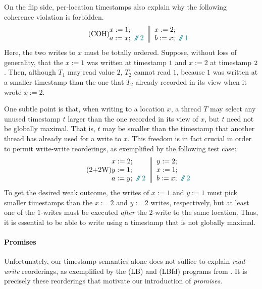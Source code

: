 On the flip side, per-location timestamps also explain why the following coherence
violation is forbidden.
\begin{equation}\label{eq:COH}\tag{COH}
\inarrII{x:=1;\\a:=x;\comment{2}}{x:=2;\\b:=x;\comment{1}}
\end{equation}
Here, the two writes to $x$ must be totally ordered.  Suppose, without
loss of generality, that the $x:=1$ was written at timestamp $\mbox{\small1}$ and
$x:=2$ at timestamp $\mbox{\small2}$.  Then, although $T_1$ may read value $2$,
$T_2$ cannot read $1$, because $1$ was written at a smaller timestamp
than the one that $T_2$ already recorded in its view when it wrote $x:=2$.


One subtle point is that, when writing to a location $x$, a
thread $T$ may select any unused timestamp $t$ larger than the one
recorded in its view of $x$, but $t$ need not be globally maximal.
That is, $t$ may be smaller than the timestamp that another thread has
already used for a write to $x$.  %
This freedom is in fact crucial in order to permit write-write reorderings, as
exemplified by the following test case:
\begin{equation}\label{eq:2+2W}\tag{2+2W}
\inarrII{x:=2;\\y:=1;\\a:=y;\comment{2}}{y:=2;\\x:=1;\\b:=x;\comment{2}}
\end{equation}
To get the desired weak outcome, the writes of $x:=1$ and $y:=1$ must
pick smaller timestamps than the $x:=2$ and $y:=2$ writes,
respectively, but at least one of the $1$-writes must be executed
\emph{after} the $2$-write to the same location.  Thus, it is essential
to be able to write using a timestamp that is not globally maximal.

\paragraph{Promises}

Unfortunately, our timestamp semantics alone does not suffice
to explain \emph{read-write} reorderings, as exemplified by the (LB)
and (LBfd) programs from .  It is precisely these
reorderings that motivate our introduction of \emph{promises}.

